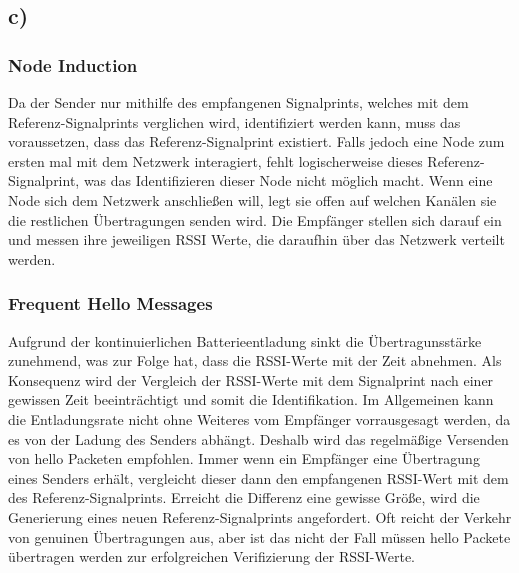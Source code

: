 \documentclass[12pt,a4paper]{article}
\begin{document}
\subsection*{c)} 

\subsubsection*{Node Induction}
Da der Sender nur mithilfe des empfangenen Signalprints,
welches mit dem Referenz-Signalprints verglichen wird, 
identifiziert werden kann, muss das voraussetzen, dass 
das Referenz-Signalprint existiert. Falls jedoch eine 
Node zum ersten mal mit dem Netzwerk interagiert, fehlt 
logischerweise dieses Referenz-Signalprint, was das 
Identifizieren dieser Node nicht möglich macht. 
Wenn eine Node sich dem Netzwerk anschließen will, legt 
sie offen auf welchen Kanälen sie die restlichen 
Übertragungen senden wird. Die Empfänger stellen sich 
darauf ein und messen ihre jeweiligen RSSI Werte, die 
daraufhin über das Netzwerk verteilt werden. 

\subsubsection*{Frequent Hello Messages}
Aufgrund der kontinuierlichen Batterieentladung sinkt 
die Übertragunsstärke zunehmend, was zur Folge hat, 
dass die RSSI-Werte mit der Zeit abnehmen. 
Als Konsequenz wird der Vergleich der RSSI-Werte mit 
dem Signalprint nach einer gewissen Zeit beeinträchtigt 
und somit die Identifikation.
Im Allgemeinen kann die Entladungsrate nicht ohne Weiteres 
vom Empfänger vorrausgesagt werden, da es von der Ladung 
des Senders abhängt. Deshalb wird das regelmäßige Versenden 
von  \glqq hello\grqq \hspace{0.5mm} Packeten empfohlen.
Immer wenn ein Empfänger eine Übertragung eines Senders erhält, 
vergleicht dieser dann den empfangenen RSSI-Wert mit dem des 
Referenz-Signalprints. Erreicht die Differenz eine gewisse 
Größe, wird die Generierung eines neuen Referenz-Signalprints 
angefordert. Oft reicht der Verkehr von genuinen Übertragungen 
aus, aber ist das nicht der Fall müssen \glqq hello\grqq
\hspace{0.5mm}Packete übertragen werden zur erfolgreichen 
Verifizierung der RSSI-Werte.
\end{document}
